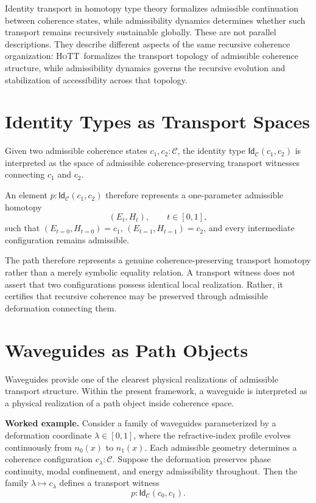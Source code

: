 \documentclass[11pt,openany]{book}
\theoremstyle{definition}
\theoremstyle{plain}
\newcommand{\idtype}{\mathsf{Id}}
\newcommand{\HoTT}{\textsc{HoTT}}
\begin{document}
Identity transport in homotopy type theory formalizes admissible continuation between coherence states, while admissibility dynamics determines whether such transport remains recursively sustainable globally. These are not parallel descriptions. They describe different aspects of the same recursive coherence organization: \HoTT\ formalizes the transport topology of admissible coherence structure, while admissibility dynamics governs the recursive evolution and stabilization of accessibility across that topology.

\section{Identity Types as Transport Spaces}

Given two admissible coherence states $c_1, c_2 : \mathcal{C}$, the identity type $\idtype_{\mathcal{C}}(c_1,c_2)$ is interpreted as the space of admissible coherence-preserving transport witnesses connecting $c_1$ and $c_2$.

An element $p : \idtype_{\mathcal{C}}(c_1,c_2)$ therefore represents a one-parameter admissible homotopy
\[
(E_t, H_t), \qquad t \in [0,1],
\]
such that $(E_{t=0}, H_{t=0}) = c_1$, $(E_{t=1}, H_{t=1}) = c_2$, and every intermediate configuration remains admissible.

The path therefore represents a genuine coherence-preserving transport homotopy rather than a merely symbolic equality relation. A transport witness does not assert that two configurations possess identical local realization. Rather, it certifies that recursive coherence may be preserved through admissible deformation connecting them.

\section{Waveguides as Path Objects}

Waveguides provide one of the clearest physical realizations of admissible transport structure. Within the present framework, a waveguide is interpreted as a physical realization of a path object inside coherence space.

\textbf{Worked example.} Consider a family of waveguides parameterized by a deformation coordinate $\lambda \in [0,1]$, where the refractive-index profile evolves continuously from $n_0(x)$ to $n_1(x)$. Each admissible geometry determines a coherence configuration $c_\lambda : \mathcal{C}$. Suppose the deformation preserves phase continuity, modal confinement, and energy admissibility throughout. Then the family $\lambda \mapsto c_\lambda$ defines a transport witness
\[
p : \idtype_{\mathcal{C}}(c_0,c_1).
\]
\end{document}
